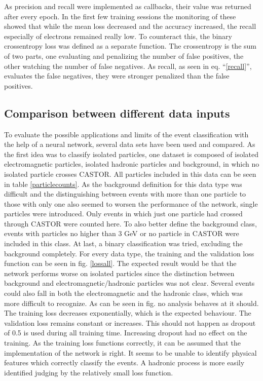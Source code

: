 As precision and recall were implemented as callbacks, their value was returned after every epoch. In the first few training sessions the monitoring of these showed that while the mean loss decreased and the accuracy increased, the recall especially of electrons remained really low. To counteract this, the binary crossentropy loss was defined as a separate function. The crossentropy is the sum of two parts, one evaluating and penalizing the number of false positives, the other watching the number of false negatives. As recall, as seen in eq. \enquote{\ref{recall}}, evaluates the false negatives, they were stronger penalized than the false positives.

\subsection{Comparison between different data inputs}

To evaluate the possible applications and limits of the event classification with the help of a neural network, several data sets have been used and compared. As the first idea was to classify isolated particles, one dataset is composed of isolated electromagnetic particles, isolated hadronic particles and background, in which no isolated particle crosses CASTOR. All particles included in this data can be seen in table \ref{particlecounts}. As the background definition for this data type was difficult and the distinguishing between events with more than one particle to those with only one also seemed to worsen the performance of the network, single particles were introduced. Only events in which just one particle had crossed through CASTOR were counted here. To also better define the background class, events with particles no higher than 3 GeV or no particle in CASTOR	were included in this class. At last, a binary classification was tried, excluding the background completely. For every data type, the training and the validation loss function can be seen in fig. \ref{lossall}. The expected result would be that the network performs worse on isolated particles since the distinction between background and electromagnetic/hadronic particles was not clear. Several events could also fall in both the electromagnetic and the hadronic class, which was more difficult to recognize. As can be seen in fig. no analysis behaves at it should. The training loss decreases exponentially, which is the expected behaviour. The validation loss remains constant or increases. This should not happen as dropout of 0.5 is used during all training time. Increasing dropout had no effect on the training. As the training loss functions correctly, it can be assumed that the implementation of the network is right. It seems to be unable to identify physical features which correctly classify the events. A hadronic process is more easily identified judging by the relatively small loss function. 

